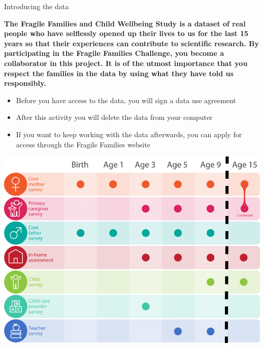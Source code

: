 \documentclass{beamer}
\begin{document}
\begin{frame}

\Large{
\begin{center}
Introducing the data
\end{center}
}

\end{frame}
\begin{frame}

\textbf{The Fragile Families and Child Wellbeing Study is a dataset of real people who have selflessly opened up their lives to us for the last 15 years so that their experiences can contribute to scientific research. By participating in the Fragile Families Challenge, you become a collaborator in this project. It is of the utmost importance that you respect the families in the data by using what they have told us responsibly.}

\end{frame}
\begin{frame}

\begin{itemize}
\item Before you have access to the data, you will sign a data use agreement
\pause
\item After this activity you will delete the data from your computer
\pause
\item If you want to keep working with the data afterwards, you can apply for access through the Fragile Families website
\end{itemize}

\end{frame}
\begin{frame}

\begin{center}
\includegraphics[width=\textwidth]{figures/ff_design_public2}
\end{center}

\end{frame}
\end{document}
